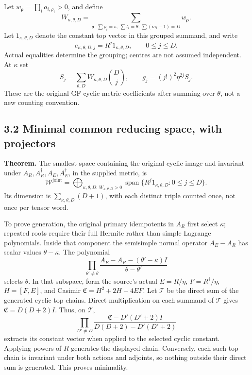 \documentclass[
  11pt,
]{article}
\begin{document}
Let \(w_{\boldsymbol\rho}=\prod_i a_{i,\rho_i}>0\), and define \[
W_{\kappa,\theta,D}
=\sum_{\boldsymbol\rho:\,\sum\rho_i=\kappa,\,\sum t_i=\theta,\,\sum(m_i-1)=D}
 w_{\boldsymbol\rho}.
\tag{ER3}
\] Let \(1_{\kappa,\theta,D}\) denote the constant top vector in this
grouped summand, and write \[
e_{\kappa,\theta,D,j}=R^j1_{\kappa,\theta,D},\qquad 0\le j\le D.
\] Actual equalities determine the grouping; centres are not assumed
independent. At \(\kappa\) set \[
S_j=\sum_{\theta,D}W_{\kappa,\theta,D}\binom Dj,
\qquad g_j=(j!)^2\eta^{2j}S_j.
\tag{ER4}
\] These are the original GF cyclic metric coefficients after summing
over \(\theta\), not a new counting convention.

\subsection{3.2 Minimal common reducing space, with
projectors}\label{minimal-common-reducing-space-with-projectors}

\textbf{Theorem.} The smallest space containing the original cyclic
image and invariant under \(A_R,A_R^\dagger,A_E,A_E^\dagger\), in the
supplied metric, is \[
\boxed{
\mathscr W^{\mathrm{joint}}
=\bigoplus_{\kappa,\theta,D:\,W_{\kappa,\theta,D}>0}
\operatorname{span}\{R^j1_{\kappa,\theta,D}:0\le j\le D\}.
} \tag{ER5}
\] Its dimension is \(\sum_{\kappa,\theta,D}(D+1)\), with each distinct
triple counted once, not once per tensor word.

To prove generation, the original primary idempotents in \(A_R\) first
select \(\kappa\); repeated roots require their full Hermite rather than
simple Lagrange polynomials. Inside that component the semisimple normal
operator \(A_E-A_R\) has scalar values \(\theta-\kappa\). The polynomial
\[
\prod_{\theta'\ne\theta}
\frac{A_E-A_R-(\theta'-\kappa)I}{\theta-\theta'}
\tag{ER6}
\] selects \(\theta\). In that subspace, form the source's actual
\(E=R/\eta\), \(F=R^\dagger/\eta\), \(H=[F,E]\), and Casimir
\(\mathfrak C=H^2+2H+4EF\). Let \(\mathscr T\) be the direct sum of the
generated cyclic top chains. Direct multiplication on each summand of
\(\mathscr T\) gives \(\mathfrak C=D(D+2)I\). Thus, on \(\mathscr T\),
\[
\prod_{D'\ne D}
\frac{\mathfrak C-D'(D'+2)I}{D(D+2)-D'(D'+2)}
\tag{ER7}
\] extracts its constant vector when applied to the selected cyclic
constant. Applying powers of \(R\) generates the displayed chain.
Conversely, each such top chain is invariant under both actions and
adjoints, so nothing outside their direct sum is generated. This proves
minimality.
\end{document}
